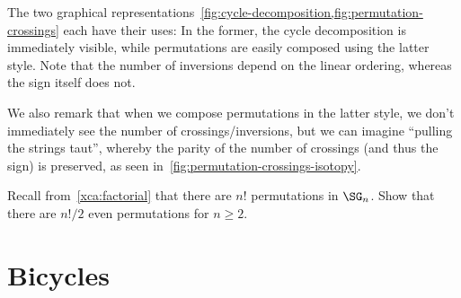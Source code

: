 \begin{remark}
  The two graphical representations~\cref{fig:cycle-decomposition,fig:permutation-crossings}
  each have their uses: In the former, the cycle decomposition is immediately
  visible, while permutations are easily composed using the latter style.
  Note that the number of inversions depend on the linear ordering,
  whereas the sign itself does not.
  \begin{marginfigure}
    \caption{The composition $(1\;2)(1\;2) = \id_{\bn 2}$ illustrated
      in the style of~\cref{fig:permutation-crossings}, with first two, then no
      crossings.}
    \label{fig:permutation-crossings-isotopy}
  \end{marginfigure}
  We also remark that when we compose permutations in the latter style,
  we don't immediately see the number of crossings/inversions, but we can imagine
  ``pulling the strings taut'', whereby the parity of the number of crossings
  (and thus the sign) is preserved, as seen in~\cref{fig:permutation-crossings-isotopy}.
\end{remark}

\begin{xca}
  Recall from~\cref{xca:factorial} that there are $n!$
  permutations in $\SG_n$.
  Show that there are $n!/2$ even permutations for $n\ge 2$.
\end{xca}

\section{Bicycles}
\label{sec:bicycles}

